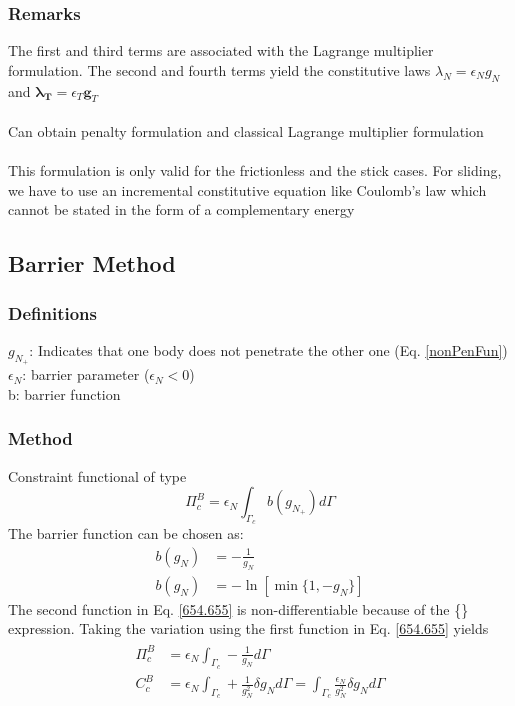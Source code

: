 \documentclass[12pt,3p]{article}
\numberwithin{equation}{section}
\begin{document}
\subsubsection{Remarks}
The first and third terms are associated with the Lagrange multiplier formulation. The second and fourth terms yield the constitutive laws $\lambda_N = \epsilon_N g_N$ and $\pmb{\lambda_T} = \epsilon_T \pmb{g}_T$ \\ \\
Can obtain penalty formulation and classical Lagrange multiplier formulation \\ \\
This formulation is only valid for the frictionless and the stick cases. For sliding, we have to use an incremental constitutive equation like Coulomb's law which cannot be stated in the form of a complementary energy

\subsection{Barrier Method}
\subsubsection{Definitions}
$g_{N_{+}}$: Indicates that one body does not penetrate the other one (Eq. \ref{nonPenFun}) \\
$\epsilon_N$: barrier parameter ($\epsilon_N < 0$) \\
b: barrier function 

\subsubsection{Method}
Constraint functional of type 
\begin{equation}\label{653}
\Pi_c^B = \epsilon_N \int_{\Gamma_c} b (g_{N_{+}}) d \Gamma
\end{equation}
The barrier function can be chosen as:
\begin{align}\label{654.655}
b(g_N) &= - \frac{1}{g_N} \\
b(g_N) &= - \ln [ \min \{1, -g_N\}]
\end{align}
The second function in Eq. \ref{654.655} is non-differentiable because of the \{\} expression. Taking the variation using the first function in Eq. \ref{654.655} yields 
\begin{align}\label{656}
\begin{split}
\Pi_c^B &= \epsilon_N \int_{\Gamma_c} - \frac{1}{g_N} d \Gamma \\
C_c^B &= \epsilon_N \int_{\Gamma_c} + \frac{1}{g_N^2} \delta g_N d \Gamma = \int_{\Gamma_c} \frac{\epsilon_N}{g_N^2} \delta g_N  d \Gamma
\end{split}
\end{align}
\end{document}
